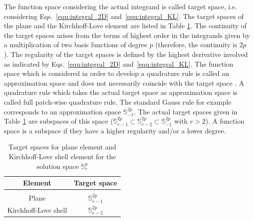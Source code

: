 \documentclass[3p]{elsarticle}
\begin{document}
The function space considering the actual integrand is called target space, i.e. considering Eqs.~\eqref{equ:integral_2D} and~\eqref{equ:integral_KL}. The target spaces of the plane and the Kirchhoff-Love element are listed in Table \ref{tab:target_space}. The continuity of the target spaces arises from the terms of highest order in the integrands given by a multiplication of two basis functions of degree $p$ (therefore, the continuity is $2p$). The regularity of the target spaces is defined by the highest derivative involved as indicated by Eqs.~\eqref{equ:integral_2D} and~\eqref{equ:integral_KL}. The function space which is considered in order to develop a quadrature rule is called an approximation space and does not necessarily coincide with the target space \cite{Adam2015}. A quadrature rule which takes the actual target space as approximation space is called full patch-wise quadrature rule. The standard Gauss rule for example corresponds to an approximation space $\mathbb{S}^{2p}_{-1}$. The actual target spaces given in Table \ref{tab:target_space} are subspaces of this space ($\mathbb{S}^{2p}_{r-1} \subset \mathbb{S}^{2p}_{r-2} \subset \mathbb{S}^{2p}_{-1}$ with $r>2$). A function space is a subspace if they have a higher regularity and/or a lower degree. \bigskip

\begin{table} 
	\caption{\label{tab:target_space}Target spaces for plane element and Kirchhoff-Love shell element for the solution space $\mathbb{S}_r^p$}
	\begin{center}
		\begin{tabular}{cc}
			Element & Target space \\ \hline &\\[-2ex]
			Plane & $\mathbb{S}_{r-1}^{2p}$ \\
			Kirchhoff-Love shell & $\mathbb{S}_{r-2}^{2p}$
		\end{tabular}
	\end{center}
\end{table}
\end{document}
